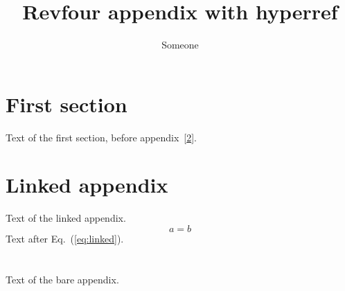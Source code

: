 \documentclass{revtex4}
\begin{document}
\title{Revfour appendix with hyperref}
\author{Someone}
\maketitle
\section{First section}
Text of the first section, before appendix~[\ref{app:linked}].
\appendix*
\section{Linked appendix}\label{app:linked}
Text of the linked appendix.
\begin{equation}
a = b \label{eq:linked}
\end{equation}
Text after Eq.~(\ref{eq:linked}).
\section{}
Text of the bare appendix.
\end{document}
